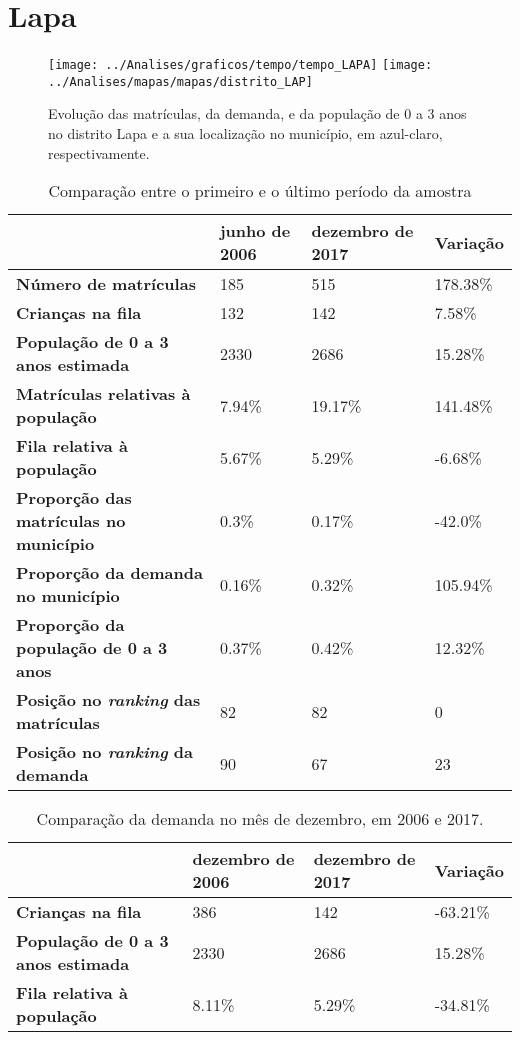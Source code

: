 \section{Lapa}
\begin{figure}[H]
\centering
\texttt{[image: ../Analises/graficos/tempo/tempo\_LAPA]}
\texttt{[image: ../Analises/mapas/mapas/distrito\_LAP]}
\caption{Evolução das matrículas, da demanda, e da população de 0 a 3 anos no distrito Lapa e a sua localização no município, em azul-claro, respectivamente.}
\end{figure}
\begin{table}[H]
\begin{tabular}{l|l|l|l}
\textbf{}                                      & \textbf{junho de 2006}       & \textbf{dezembro de 2017}    & \textbf{Variação} \\ \hline
\textbf{Número de matrículas}                  & 185 & 515 & 178.38\% \\ \hline
\textbf{Crianças na fila}                      & 132 & 142 & 7.58\% \\ \hline
\textbf{População de 0 a 3 anos estimada}      & 2330 & 2686 & 15.28\% \\ \hline
\textbf{Matrículas relativas à população}      & 7.94\% & 19.17\% & 141.48\% \\ \hline
\textbf{Fila relativa à população}             & 5.67\% & 5.29\% & -6.68\% \\ \hline
\textbf{Proporção das matrículas no município} & 0.3\% & 0.17\% & -42.0\% \\ \hline
\textbf{Proporção da demanda no município}     & 0.16\% & 0.32\% & 105.94\% \\ \hline
\textbf{Proporção da população de 0 a 3 anos}  & 0.37\% & 0.42\% & 12.32\% \\ \hline
\textbf{Posição no \textit{ranking} das matrículas}     & 82 & 82 & 0 \\ \hline
\textbf{Posição no \textit{ranking} da demanda}         & 90 & 67 & 23 \\ 
\end{tabular}
\caption{Comparação entre o primeiro e o último período da amostra}
\end{table}
\begin{table}[H]
\begin{tabular}{l|l|l|l}
\textbf{}                                 & \textbf{dezembro de 2006} & \textbf{dezembro de 2017} & \textbf{Variação} \\ \hline
\textbf{Crianças na fila}                      & 386 & 142 & -63.21\% \\ \hline
\textbf{População de 0 a 3 anos estimada}      & 2330 & 2686 & 15.28\% \\ \hline
\textbf{Fila relativa à população}             & 8.11\% & 5.29\% & -34.81\% \\
\end{tabular}
\caption{Comparação da demanda no mês de dezembro, em 2006 e 2017.}
\end{table}

